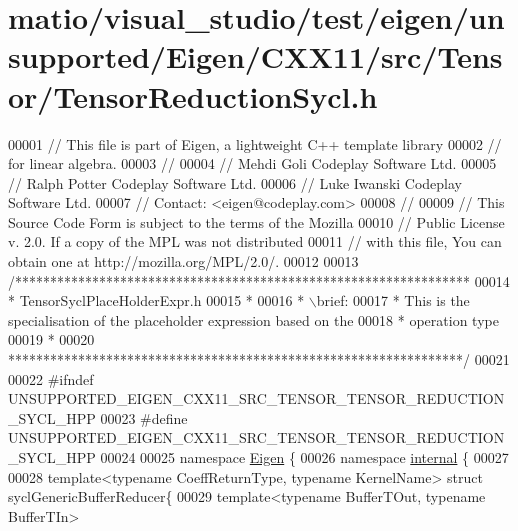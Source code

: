\hypertarget{matio_2visual__studio_2test_2eigen_2unsupported_2_eigen_2_c_x_x11_2src_2_tensor_2_tensor_reduction_sycl_8h_source}{}\section{matio/visual\+\_\+studio/test/eigen/unsupported/\+Eigen/\+C\+X\+X11/src/\+Tensor/\+Tensor\+Reduction\+Sycl.h}
\label{matio_2visual__studio_2test_2eigen_2unsupported_2_eigen_2_c_x_x11_2src_2_tensor_2_tensor_reduction_sycl_8h_source}

\begin{DoxyCode}
00001 \textcolor{comment}{// This file is part of Eigen, a lightweight C++ template library}
00002 \textcolor{comment}{// for linear algebra.}
00003 \textcolor{comment}{//}
00004 \textcolor{comment}{// Mehdi Goli    Codeplay Software Ltd.}
00005 \textcolor{comment}{// Ralph Potter  Codeplay Software Ltd.}
00006 \textcolor{comment}{// Luke Iwanski  Codeplay Software Ltd.}
00007 \textcolor{comment}{// Contact: <eigen@codeplay.com>}
00008 \textcolor{comment}{//}
00009 \textcolor{comment}{// This Source Code Form is subject to the terms of the Mozilla}
00010 \textcolor{comment}{// Public License v. 2.0. If a copy of the MPL was not distributed}
00011 \textcolor{comment}{// with this file, You can obtain one at http://mozilla.org/MPL/2.0/.}
00012 
00013 \textcolor{comment}{/*****************************************************************}
00014 \textcolor{comment}{ * TensorSyclPlaceHolderExpr.h}
00015 \textcolor{comment}{ *}
00016 \textcolor{comment}{ * \(\backslash\)brief:}
00017 \textcolor{comment}{ *  This is the specialisation of the placeholder expression based on the}
00018 \textcolor{comment}{ * operation type}
00019 \textcolor{comment}{ *}
00020 \textcolor{comment}{*****************************************************************/}
00021 
00022 \textcolor{preprocessor}{#ifndef UNSUPPORTED\_EIGEN\_CXX11\_SRC\_TENSOR\_TENSOR\_REDUCTION\_SYCL\_HPP}
00023 \textcolor{preprocessor}{#define UNSUPPORTED\_EIGEN\_CXX11\_SRC\_TENSOR\_TENSOR\_REDUCTION\_SYCL\_HPP}
00024 
00025 \textcolor{keyword}{namespace }\hyperlink{namespace_eigen}{Eigen} \{
00026 \textcolor{keyword}{namespace }\hyperlink{namespaceinternal}{internal} \{
00027 
00028 \textcolor{keyword}{template}<\textcolor{keyword}{typename} CoeffReturnType, \textcolor{keyword}{typename} KernelName> \textcolor{keyword}{struct }syclGenericBufferReducer\{
00029 \textcolor{keyword}{template}<\textcolor{keyword}{typename} BufferTOut, \textcolor{keyword}{typename} BufferTIn>

\end{DoxyCode}
